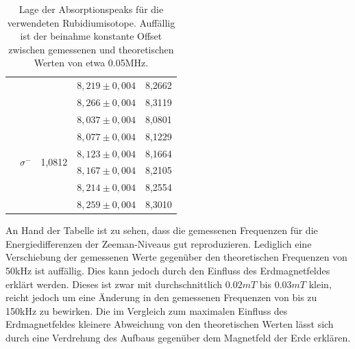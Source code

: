 \documentclass[bigchapter,colorback,accentcolor=tud4b,linedtoc,11pt]{tudreport}
\begin{document}
\begin{table}[H]
\begin{center}
\begin{tabular}{c|c l|ll}
                                  &                               &                         & $8,219 \pm 0,004$ & 8,2662                       \\ 
                                  &                               &                         & $8,266 \pm 0,004$ & 8,3119                       \\ \cline{2-5}
                                  & \multirow{6}{*}{$\sigma^{-}$} & \multirow{6}{*}{1,0812} & $8,037 \pm 0,004$ & 8,0801                       \\ 
                                  &                               &                         & $8,077 \pm 0,004$ & 8,1229                       \\ 
                                  &                               &                         & $8,123 \pm 0,004$ & 8,1664                       \\ 
                                  &                               &                         & $8,167 \pm 0,004$ & 8,2105                       \\ 
                                  &                               &                         & $8,214 \pm 0,004$ & 8,2554                       \\ 
                                  &                               &                         & $8,259 \pm 0,004$ & 8,3010                       \\ \hline
    \end{tabular}
    \caption{Lage der Absorptionspeaks für die verwendeten
      Rubidiumisotope. Auffällig ist der beinahme konstante Offset zwischen
      gemessenen und theoretischen Werten von etwa 0.05MHz.}
  \end{center}
\end{table}

An Hand der Tabelle ist zu sehen, dass die gemessenen Frequenzen für die
Energiedifferenzen der Zeeman-Niveaus gut reproduzieren. Lediglich eine
Verschiebung der gemessenen Werte gegenüber den theoretischen Frequenzen von
50kHz ist auffällig. Dies kann jedoch durch den Einfluss des Erdmagnetfeldes
erklärt werden. Dieses ist zwar mit durchschnittlich $0.02mT$ bis $0.03mT$
klein, reicht jedoch um eine Änderung in den gemessenen Frequenzen von bis zu
150kHz zu bewirken. Die im Vergleich zum maximalen Einfluss des Erdmagnetfeldes
kleinere Abweichung von den theoretischen Werten lässt sich durch eine
Verdrehung des Aufbaus gegenüber dem Magnetfeld der Erde erklären.
\end{document}
